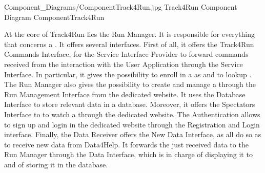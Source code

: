 \documentclass[../../DD.tex]{subfiles}
\begin{document}
	\image {13cm} {Component_Diagrams/ComponentTrack4Run.jpg} {Track4Run Component Diagram} {ComponentTrack4Run}

	At the core of Track4Run lies the Run Manager. It is responsible for everything that concerns a . It offers several interfaces. First of all, it offers the Track4Run Commands Interface, for the Service Interface Provider to forward commands received from the interaction with the User Application through the Service Interface. In particular, it gives  the possibility to enroll in a  as  and to lookup . The Run Manager also gives  the possibility to create and manage a  through the Run Management Interface from the  dedicated website. It uses the Database Interface to store relevant data in a database. Moreover, it offers the Spectators Interface to  to watch a  through the  dedicated website.
	The Authentication allows  to sign up and login in the dedicated website through the Registration and Login interface.
	Finally, the Data Receiver offers the New Data Interface, as all  do so as to receive new data from Data4Help. It forwards the just received data to the Run Manager through the Data Interface, which is in charge of displaying it to  and of storing it in the database.
	
\end{document}
